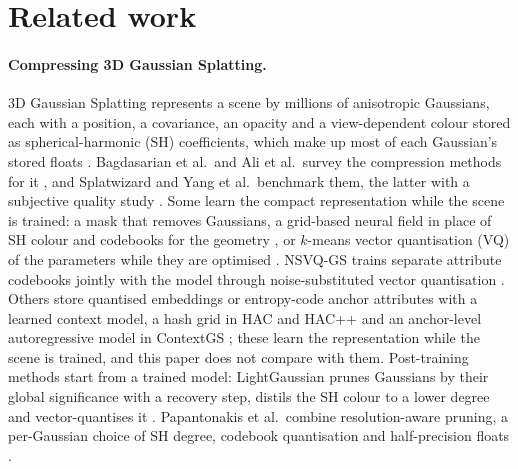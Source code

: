 \section{Related work}
\label{sec:related}

\paragraph{Compressing 3D Gaussian Splatting.}
3D Gaussian Splatting represents a scene by millions of anisotropic Gaussians, each with a position, a covariance, an opacity and a view-dependent colour stored as spherical-harmonic (SH) coefficients, which make up most of each Gaussian's stored floats \citep{kerbl2023gaussian}.
Bagdasarian et al.\ and Ali et al.\ survey the compression methods for it \citep{bagdasarian2025zip,ali2026compression}, and Splatwizard and Yang et al.\ benchmark them, the latter with a subjective quality study \citep{liu2026splatwizard,yang2024benchmark}.
Some learn the compact representation while the scene is trained: a mask that removes Gaussians, a grid-based neural field in place of SH colour and codebooks for the geometry \citep{lee2024compact}, or $k$-means vector quantisation (VQ) of the parameters while they are optimised \citep{navaneet2024compgs}.
NSVQ-GS trains separate attribute codebooks jointly with the model through noise-substituted vector quantisation \citep{wang2025compressing}.
Others store quantised embeddings \citep{girish2024eagles} or entropy-code anchor attributes with a learned context model, a hash grid in HAC and HAC++ and an anchor-level autoregressive model in ContextGS \citep{chen2024hac,chen2025hacpp,wang2024contextgs}; these learn the representation while the scene is trained, and this paper does not compare with them.
Post-training methods start from a trained model: LightGaussian prunes Gaussians by their global significance with a recovery step, distils the SH colour to a lower degree and vector-quantises it \citep{fan2024lightgaussian}.
Papantonakis et al.\ combine resolution-aware pruning, a per-Gaussian choice of SH degree, codebook quantisation and half-precision floats \citep{papantonakis2024reducing}.
